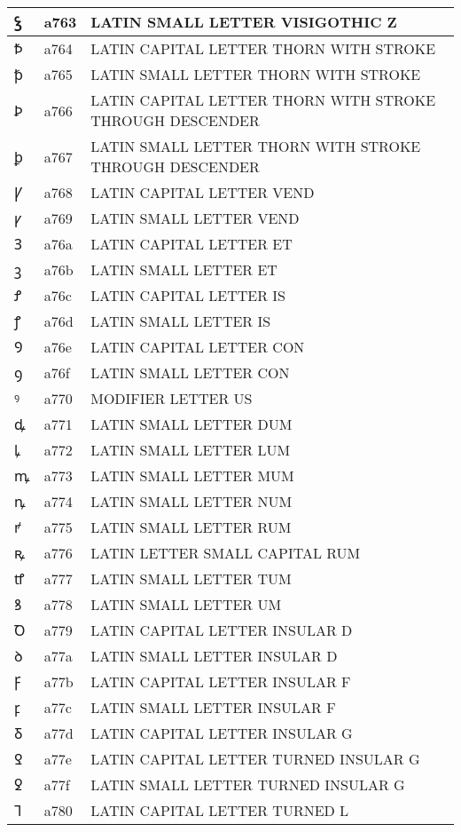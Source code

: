 \documentclass[12pt,letterpaper,openany]{book}
\begin{document}
\begin{center}
\begin{supertabular}{|m{0.25in}|m{0.5in}|m{4in}|}
ꝣ & a763 & LATIN SMALL LETTER VISIGOTHIC Z\\\hline
Ꝥ & a764 & LATIN CAPITAL LETTER THORN WITH STROKE\\\hline
ꝥ & a765 & LATIN SMALL LETTER THORN WITH STROKE\\\hline
Ꝧ & a766 & LATIN CAPITAL LETTER THORN WITH STROKE THROUGH DESCENDER\\\hline
ꝧ & a767 & LATIN SMALL LETTER THORN WITH STROKE THROUGH DESCENDER\\\hline
Ꝩ & a768 & LATIN CAPITAL LETTER VEND\\\hline
ꝩ & a769 & LATIN SMALL LETTER VEND\\\hline
Ꝫ & a76a & LATIN CAPITAL LETTER ET\\\hline
ꝫ & a76b & LATIN SMALL LETTER ET\\\hline
Ꝭ & a76c & LATIN CAPITAL LETTER IS\\\hline
ꝭ & a76d & LATIN SMALL LETTER IS\\\hline
Ꝯ & a76e & LATIN CAPITAL LETTER CON\\\hline
ꝯ & a76f & LATIN SMALL LETTER CON\\\hline
ꝰ & a770 & MODIFIER LETTER US\\\hline
ꝱ & a771 & LATIN SMALL LETTER DUM\\\hline
ꝲ & a772 & LATIN SMALL LETTER LUM\\\hline
ꝳ & a773 & LATIN SMALL LETTER MUM\\\hline
ꝴ & a774 & LATIN SMALL LETTER NUM\\\hline
ꝵ & a775 & LATIN SMALL LETTER RUM\\\hline
ꝶ & a776 & LATIN LETTER SMALL CAPITAL RUM\\\hline
ꝷ & a777 & LATIN SMALL LETTER TUM\\\hline
ꝸ & a778 & LATIN SMALL LETTER UM\\\hline
Ꝺ & a779 & LATIN CAPITAL LETTER INSULAR D\\\hline
ꝺ & a77a & LATIN SMALL LETTER INSULAR D\\\hline
Ꝼ & a77b & LATIN CAPITAL LETTER INSULAR F\\\hline
ꝼ & a77c & LATIN SMALL LETTER INSULAR F\\\hline
Ᵹ & a77d & LATIN CAPITAL LETTER INSULAR G\\\hline
Ꝿ & a77e & LATIN CAPITAL LETTER TURNED INSULAR G\\\hline
ꝿ & a77f & LATIN SMALL LETTER TURNED INSULAR G\\\hline
Ꞁ & a780 & LATIN CAPITAL LETTER TURNED L\\\hline

\end{supertabular}
\end{center}
\end{document}
